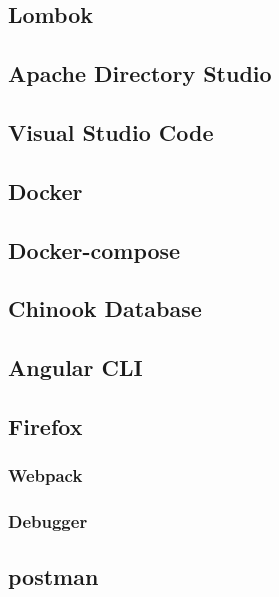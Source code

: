 \subsection{Lombok}
\subsection{Apache Directory Studio}
\subsection{Visual Studio Code}
\subsection{Docker}
\subsection{Docker-compose}
\subsection{Chinook Database}
\subsection{Angular CLI}
\subsection{Firefox}
\subsubsection{Webpack}
\subsubsection{Debugger}
\subsection{postman}
